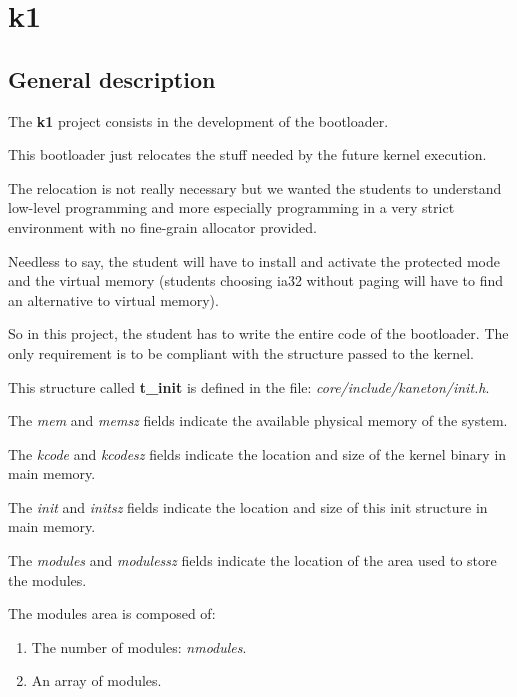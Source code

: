 
%
%

\section{k1}

\subsection{General description}

The \textbf{k1} project consists in the development of the bootloader.

This bootloader just relocates the stuff needed by the future kernel
execution.

The relocation is not really necessary but we wanted the students
to understand low-level programming and more especially programming
in a very strict environment with no fine-grain allocator provided.

Needless to  say, the  student will have  to install and  activate the
protected mode and the  virtual memory (students choosing ia32 without
paging will have to find an alternative to virtual memory).

So in this project, the student has to write the entire code of the
bootloader. The only requirement is to be compliant with the structure
passed to the kernel.

This structure called \textbf{t\_init} is defined in the
file: \textit{core/include/kaneton/init.h}.

The \textit{mem} and \textit{memsz} fields indicate the available physical
memory of the system.

The \textit{kcode} and \textit{kcodesz} fields indicate the location and
size of the kernel binary in main memory.

The \textit{init} and \textit{initsz} fields indicate the location and
size of this init structure in main memory.

The \textit{modules} and \textit{modulessz} fields indicate the
location of the area used to store the modules.

The modules area is composed of:

\begin{enumerate}
  \item
    The number of modules: \textit{nmodules}.
  \item
    An array of modules.
\end{enumerate}

